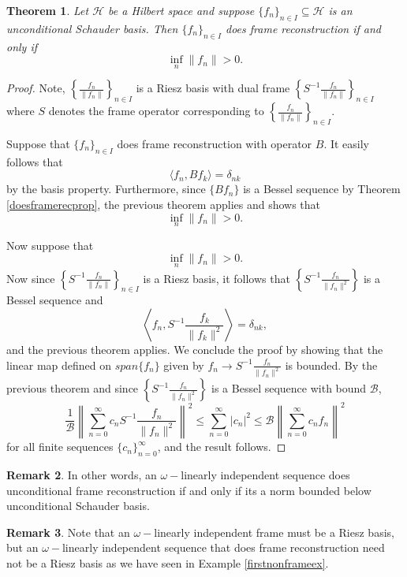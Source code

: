 \documentclass[11pt]{amsart}
\newtheorem{thm}{Theorem}[section]
\theoremstyle{definition}
\newtheorem{rem}[thm]{Remark}
\numberwithin{equation}{section}
\newcommand{\Hcal}{\mathcal{H}} %
\begin{document}
\begin{thm}
Let $\Hcal$ be a Hilbert space and suppose  $\{f_{n}\}_{n\in I}\subseteq \Hcal$ is an unconditional Schauder basis. Then $\{f_{n}\}_{n\in I}$ does frame reconstruction if and only if $$ \inf_{n}
\|f_n\|>0.$$
\end{thm}
\begin{proof}
Note, $\left\{\frac{f_n}{\|f_n\|} \right\}_{n\in I}$ is a Riesz basis with dual frame $\left\{S^{-1}\frac{f_n}{\|f_n\|} \right\}_{n\in I}$ where $S$ denotes the frame operator corresponding to $\left\{\frac{f_n}{\|f_n\|} \right\}_{n\in I}$. 

Suppose that $\{f_{n}\}_{n\in I}$ does frame reconstruction with operator $B$. It easily follows that $$\langle f_n, Bf_k\rangle=\delta_{nk}$$ by the basis property. Furthermore, since $\{Bf_n\}$ is a Bessel sequence by Theorem \ref{doesframerecprop}, the previous theorem applies and shows that $$ \inf_n
\|f_n\|>0.$$

Now suppose that $$ \inf_n
\|f_n\|>0.$$ Now since $\left\{S^{-1}\frac{f_n}{\|f_n\|} \right\}_{n\in I}$ is a Riesz basis, it follows that $\left\{S^{-1}\frac{f_n}{\|f_n\|^{2}} \right\}$ is a Bessel sequence and
$$\left\langle f_n, S^{-1}\frac{f_k}{\|f_k\|^{2}} \right \rangle=\delta_{nk},$$
and the previous theorem applies.
We conclude the proof by showing that the linear map defined on $span\{f_n\}$ given by $f_n\to S^{-1}\frac{f_n}{\|f_n\|^{2}}$ is bounded. By the previous theorem and since $\left\{S^{-1}\frac{f_n}{\|f_n\|^{2}} \right\}$ is a Bessel sequence with bound $\mathcal{B}$,
$$\frac{1}{\mathcal{B}}\left\|\sum_{n=0}^{\infty}c_nS^{-1}\frac{f_n}{\|f_n\|^{2}} \right\|^{2}\leq \sum_{n=0}^{\infty} |c_{n}|^{2}\leq \mathcal{B}\left \|\sum_{n=0}^{\infty} c_n f_n \right \|^{2}$$
for all finite sequences $\{c_n\}_{n=0}^{\infty}$, and the result follows.
\end{proof}

\begin{rem}
In other words, an $\omega-$linearly independent sequence does unconditional frame reconstruction
if and only if its a norm bounded below unconditional Schauder basis.
\end{rem}

\begin{rem}
Note that an $\omega-$linearly independent frame must be a Riesz basis, but an $\omega-$linearly independent sequence that does frame reconstruction need not be a Riesz basis as we have seen in Example \ref{firstnonframeex}.
\end{rem}
\end{document}
